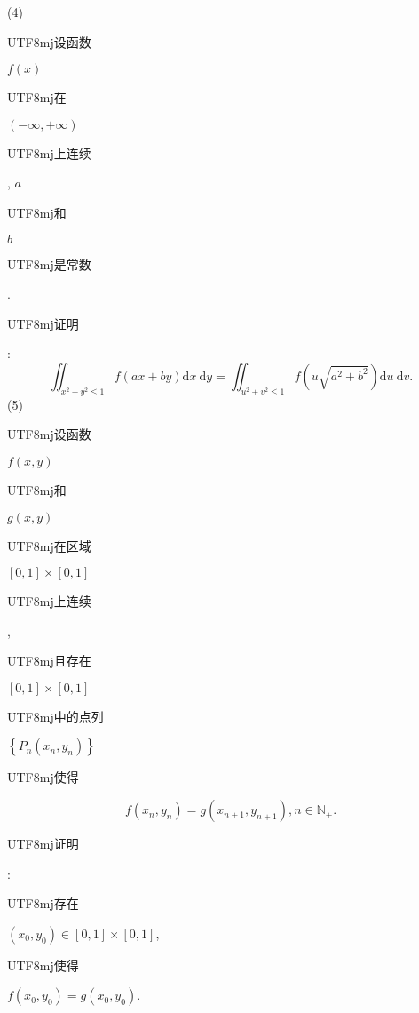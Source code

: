 \documentclass[10pt]{article}
\begin{document}
(4) \begin{CJK}{UTF8}{mj}设函数\end{CJK} $f(x)$ \begin{CJK}{UTF8}{mj}在\end{CJK} $(-\infty,+\infty)$ \begin{CJK}{UTF8}{mj}上连续\end{CJK}, $a$ \begin{CJK}{UTF8}{mj}和\end{CJK} $b$ \begin{CJK}{UTF8}{mj}是常数\end{CJK}. \begin{CJK}{UTF8}{mj}证明\end{CJK}:
$$
\iint_{x^{2}+y^{2} \leq 1} f(a x+b y) \mathrm{d} x \mathrm{~d} y=\iint_{u^{2}+v^{2} \leq 1} f\left(u \sqrt{a^{2}+b^{2}}\right) \mathrm{d} u \mathrm{~d} v .
$$
(5) \begin{CJK}{UTF8}{mj}设函数\end{CJK} $f(x, y)$ \begin{CJK}{UTF8}{mj}和\end{CJK} $g(x, y)$ \begin{CJK}{UTF8}{mj}在区域\end{CJK} $[0,1] \times[0,1]$ \begin{CJK}{UTF8}{mj}上连续\end{CJK}, \begin{CJK}{UTF8}{mj}且存在\end{CJK} $[0,1] \times[0,1]$ \begin{CJK}{UTF8}{mj}中的点列\end{CJK} $\left\{P_{n}\left(x_{n}, y_{n}\right)\right\}$ \begin{CJK}{UTF8}{mj}使得\end{CJK}
$$
f\left(x_{n}, y_{n}\right)=g\left(x_{n+1}, y_{n+1}\right), n \in \mathbb{N}_{+} .
$$
\begin{CJK}{UTF8}{mj}证明\end{CJK}: \begin{CJK}{UTF8}{mj}存在\end{CJK} $\left(x_{0}, y_{0}\right) \in[0,1] \times[0,1]$, \begin{CJK}{UTF8}{mj}使得\end{CJK} $f\left(x_{0}, y_{0}\right)=g\left(x_{0}, y_{0}\right)$.
\end{document}
